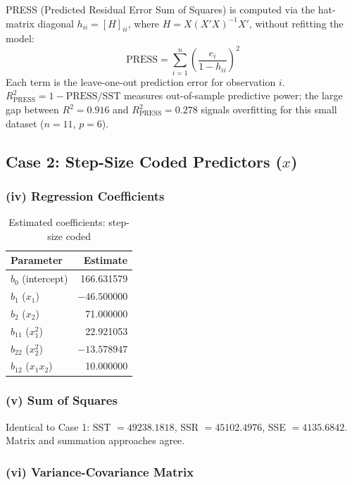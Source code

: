 \documentclass[12pt,a4paper]{article}
\begin{document}
PRESS (Predicted Residual Error Sum of Squares) is computed via the hat-matrix
diagonal $h_{ii} = [H]_{ii}$, where $H = X(X'X)^{-1}X'$, without refitting the model:
\[
  \text{PRESS} = \sum_{i=1}^{n}\!\left(\frac{e_i}{1-h_{ii}}\right)^{\!2}
\]
Each term is the leave-one-out prediction error for observation $i$.
$R^2_{\text{PRESS}} = 1 - \text{PRESS}/\text{SST}$ measures out-of-sample predictive power;
the large gap between $R^2 = 0.916$ and $R^2_{\text{PRESS}} = 0.278$ signals overfitting
for this small dataset ($n=11$, $p=6$).

\subsection{Case 2: Step-Size Coded Predictors ($x$)}

\subsubsection{(iv) Regression Coefficients}

\begin{table}[H]
\centering
\caption{Estimated coefficients: step-size coded}
\begin{tabular}{lr}
\toprule
Parameter & Estimate \\
\midrule
$b_0$ (intercept)     &  166.631579 \\
$b_1$ ($x_1$)         & $-46.500000$ \\
$b_2$ ($x_2$)         &   71.000000 \\
$b_{11}$ ($x_1^2$)    &   22.921053 \\
$b_{22}$ ($x_2^2$)    & $-13.578947$ \\
$b_{12}$ ($x_1 x_2$)  &   10.000000 \\
\bottomrule
\end{tabular}
\end{table}

\subsubsection{(v) Sum of Squares}

Identical to Case 1: SST $= 49238.1818$, SSR $= 45102.4976$, SSE $= 4135.6842$.
Matrix and summation approaches agree.

\subsubsection{(vi) Variance-Covariance Matrix}
\end{document}
